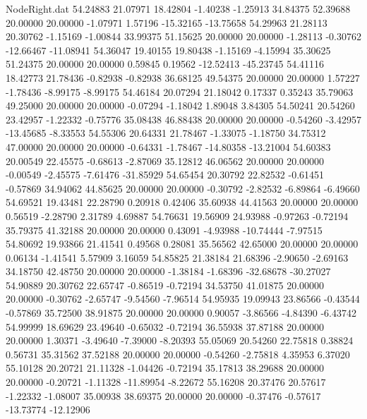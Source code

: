 \begin{filecontents}{NodeRight.dat}
  54.24883   21.07971   18.42804    -1.40238   -1.25913   34.84375   52.39688   20.00000   20.00000   -1.07971    1.57196  -15.32165  -13.75658
  54.29963   21.28113   20.30762    -1.15169   -1.00844   33.99375   51.15625   20.00000   20.00000   -1.28113   -0.30762  -12.66467  -11.08941
  54.36047   19.40155   19.80438    -1.15169   -4.15994   35.30625   51.24375   20.00000   20.00000    0.59845    0.19562  -12.52413  -45.23745
  54.41116   18.42773   21.78436    -0.82938   -0.82938   36.68125   49.54375   20.00000   20.00000    1.57227   -1.78436   -8.99175   -8.99175
  54.46184   20.07294   21.18042     0.17337    0.35243   35.79063   49.25000   20.00000   20.00000   -0.07294   -1.18042    1.89048    3.84305
  54.50241   20.54260   23.42957    -1.22332   -0.75776   35.08438   46.88438   20.00000   20.00000   -0.54260   -3.42957  -13.45685   -8.33553
  54.55306   20.64331   21.78467    -1.33075   -1.18750   34.75312   47.00000   20.00000   20.00000   -0.64331   -1.78467  -14.80358  -13.21004
  54.60383   20.00549   22.45575    -0.68613   -2.87069   35.12812   46.06562   20.00000   20.00000   -0.00549   -2.45575   -7.61476  -31.85929
  54.65454   20.30792   22.82532    -0.61451   -0.57869   34.94062   44.85625   20.00000   20.00000   -0.30792   -2.82532   -6.89864   -6.49660
  54.69521   19.43481   22.28790     0.20918    0.42406   35.60938   44.41563   20.00000   20.00000    0.56519   -2.28790    2.31789    4.69887
  54.76631   19.56909   24.93988    -0.97263   -0.72194   35.79375   41.32188   20.00000   20.00000    0.43091   -4.93988  -10.74444   -7.97515
  54.80692   19.93866   21.41541     0.49568    0.28081   35.56562   42.65000   20.00000   20.00000    0.06134   -1.41541    5.57909    3.16059
  54.85825   21.38184   21.68396    -2.90650   -2.69163   34.18750   42.48750   20.00000   20.00000   -1.38184   -1.68396  -32.68678  -30.27027
  54.90889   20.30762   22.65747    -0.86519   -0.72194   34.53750   41.01875   20.00000   20.00000   -0.30762   -2.65747   -9.54560   -7.96514
  54.95935   19.09943   23.86566    -0.43544   -0.57869   35.72500   38.91875   20.00000   20.00000    0.90057   -3.86566   -4.84390   -6.43742
  54.99999   18.69629   23.49640    -0.65032   -0.72194   36.55938   37.87188   20.00000   20.00000    1.30371   -3.49640   -7.39000   -8.20393
  55.05069   20.54260   22.75818     0.38824    0.56731   35.31562   37.52188   20.00000   20.00000   -0.54260   -2.75818    4.35953    6.37020
  55.10128   20.20721   21.11328    -1.04426   -0.72194   35.17813   38.29688   20.00000   20.00000   -0.20721   -1.11328  -11.89954   -8.22672
  55.16208   20.37476   20.57617    -1.22332   -1.08007   35.00938   38.69375   20.00000   20.00000   -0.37476   -0.57617  -13.73774  -12.12906

\end{filecontents}
